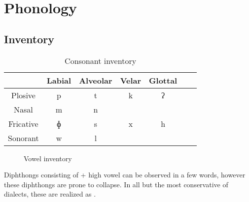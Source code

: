 \chapter{Phonology}
\section{Inventory}

\begin{table}[ht]
  \centering
  \begin{tabular}{*{7}{c}}
    \toprule
    & Labial & Alveolar & Velar & Glottal \\\midrule
    Plosive   & p      & t        & k     & ʔ       \\
    Nasal     & m      & n        &       &         \\
    Fricative & ɸ      & s        & x     & h       \\
    Sonorant  & w      & l        &       &         \\
    \bottomrule
  \end{tabular}
  \caption{Consonant inventory}
\end{table}

\begin{figure}[ht]
  \centering
  \begin{vowel}
  \end{vowel}
  \caption{Vowel inventory}
\end{figure}

Diphthongs consisting of  + high vowel can be observed in a few words, however these diphthongs are prone to collapse. In all but the most conservative of dialects, these are realized as  .
